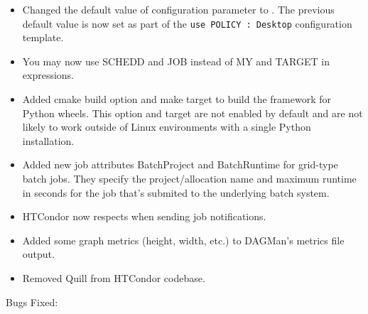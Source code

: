 \begin{itemize}

\item Changed the default value of configuration parameter 
to . The previous default value is now set as part of the
\texttt{use POLICY : Desktop} configuration template.

\item You may now use SCHEDD and JOB instead of MY and TARGET in
 expressions.

\item Added cmake build option  and make target
 to build the framework for Python wheels.
This option and target
are not enabled by default and are not likely to work outside of Linux
environments with a single Python installation.

\item Added new job attributes BatchProject and BatchRuntime for grid-type
batch jobs.
They specify the project/allocation name and maximum runtime in seconds
for the job that's submited to the underlying batch system.

\item HTCondor now respects  when sending
job notifications.

\item Added some graph metrics (height, width, etc.) to DAGMan's metrics file
output.

\item Removed Quill from HTCondor codebase.

\end{itemize}

\noindent Bugs Fixed:

